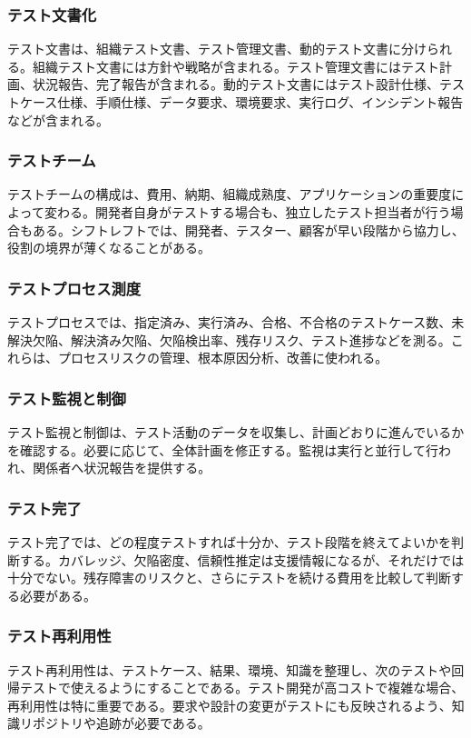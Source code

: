 \documentclass[uplatex,dvipdfmx,a4paper,11pt,nomag]{jsarticle}
\begin{document}
\subsubsection{テスト文書化}
テスト文書は、組織テスト文書、テスト管理文書、動的テスト文書に分けられる。組織テスト文書には方針や戦略が含まれる。テスト管理文書にはテスト計画、状況報告、完了報告が含まれる。動的テスト文書にはテスト設計仕様、テストケース仕様、手順仕様、データ要求、環境要求、実行ログ、インシデント報告などが含まれる。

\subsubsection{テストチーム}
テストチームの構成は、費用、納期、組織成熟度、アプリケーションの重要度によって変わる。開発者自身がテストする場合も、独立したテスト担当者が行う場合もある。シフトレフトでは、開発者、テスター、顧客が早い段階から協力し、役割の境界が薄くなることがある。

\subsubsection{テストプロセス測度}
テストプロセスでは、指定済み、実行済み、合格、不合格のテストケース数、未解決欠陥、解決済み欠陥、欠陥検出率、残存リスク、テスト進捗などを測る。これらは、プロセスリスクの管理、根本原因分析、改善に使われる。

\subsubsection{テスト監視と制御}
テスト監視と制御は、テスト活動のデータを収集し、計画どおりに進んでいるかを確認する。必要に応じて、全体計画を修正する。監視は実行と並行して行われ、関係者へ状況報告を提供する。

\subsubsection{テスト完了}
テスト完了では、どの程度テストすれば十分か、テスト段階を終えてよいかを判断する。カバレッジ、欠陥密度、信頼性推定は支援情報になるが、それだけでは十分でない。残存障害のリスクと、さらにテストを続ける費用を比較して判断する必要がある。

\subsubsection{テスト再利用性}
テスト再利用性は、テストケース、結果、環境、知識を整理し、次のテストや回帰テストで使えるようにすることである。テスト開発が高コストで複雑な場合、再利用性は特に重要である。要求や設計の変更がテストにも反映されるよう、知識リポジトリや追跡が必要である。
\end{document}
